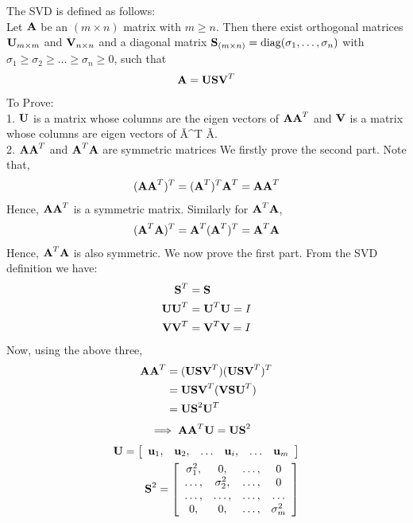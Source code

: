 \documentclass[12pt, a4paper]{article}
\begin{document}
\section{}
The SVD is defined as follows: \\ Let $\textbf{A}$ be an $(m \times n)$ matrix with $m \geq n$.
Then there exist orthogonal matrices $\textbf{U}_{m \times m}$ and $\textbf{V}_{n \times n}$ and a diagonal matrix $\textbf{S}_{(m \times n)} = \text{diag} (\sigma_1, \ldots , \sigma_n)$ with $\sigma_1 \geq \sigma_2 \geq . . . \geq \sigma_n \geq 0$, such that
\begin{align*}
    \textbf{A} = \textbf{U} \textbf{S} \textbf{V}^T
\end{align*}
To Prove: \\
    1. \qquad $\textbf{U}$ is a matrix whose columns are the eigen vectors of $\textbf{A}\textbf{A}^T$ and $\textbf{V}$ is a matrix whose columns are eigen vectors of \v{A}^T \v{A}. \\
    2. \qquad $\textbf{A}\textbf{A}^T$ and $\textbf{A}^T \textbf{A}$ are symmetric matrices
We firstly prove the second part. Note that,
\begin{align*}
    (\textbf{A}\textbf{A}^T)^T = (\textbf{A}^T)^T\textbf{A}^T = \textbf{A}\textbf{A}^T
\end{align*}
Hence, $\textbf{A}\textbf{A}^T$ is a symmetric matrix. Similarly for $\textbf{A}^T\textbf{A}$,
\begin{align*}
(\textbf{A}^T\textbf{A})^T = \textbf{A}^T(\textbf{A}^T)^T = \textbf{A}^T\textbf{A}
\end{align*}
Hence, $\textbf{A}^T\textbf{A}$ is also symmetric. We now prove the first part.
From the SVD definition we have:
\begin{align}
    \textbf{S}^T &= \textbf{S}\\
    \textbf{U}\textbf{U}^T &= \textbf{U}^T\textbf{U} = I \\
    \textbf{V}\textbf{V}^T &= \textbf{V}^T\textbf{V} = I
\end{align}
Now, using the above three,
\begin{align*}
    \textbf{A}\textbf{A}^T &= (\textbf{U}\textbf{S}\textbf{V}^T)(\textbf{U}\textbf{S}\textbf{V}^T) ^T \\
     &= \textbf{U}\textbf{S}\textbf{V}^T(\textbf{V}\textbf{S}\textbf{U}^T) \\
     &= \textbf{U}\textbf{S}^2\textbf{U}^T
\end{align*}
\begin{align}
    \implies \textbf{A}\textbf{A}^T\textbf{U} &= \textbf{U}\textbf{S}^2
\end{align}
\begin{align*}
    \textbf{U} =
    \left[ {\begin{array}{cccccc}
        \textbf{u}_1,& \textbf{u}_2,& \ldots & \textbf{u}_i,& \ldots& \textbf{u}_m
    \end{array} } \right] \\
    \textbf{S}^2 =
    \left[ {\begin{array}{cccc}
        \sigma_1^2 ,& 0 ,& \ldots ,& 0 \\
        \ldots ,& \sigma_2^2 ,& \ldots ,& 0 \\
        \ldots ,& \ldots ,& \ldots ,& \ldots \\
        0 ,& 0 ,& \ldots ,& \sigma_m^2
    \end{array} } \right]
\end{align*}
\end{document}
